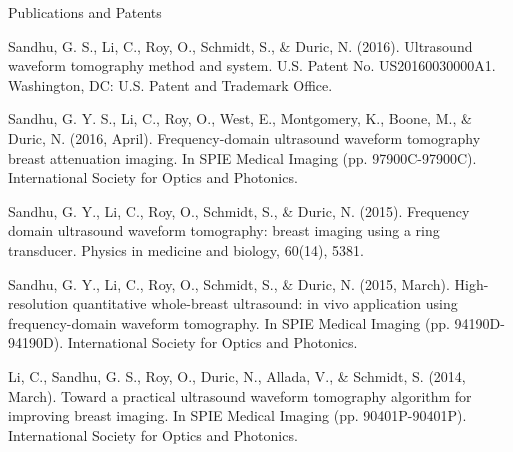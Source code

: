 \documentclass{resume} %
\begin{document}
\begin{rSection}{Publications and Patents}
\item Sandhu, G. S., Li, C., Roy, O., Schmidt, S., \& Duric, N. (2016). Ultrasound waveform tomography method and system. U.S. Patent No. US20160030000A1. Washington, DC: U.S. Patent and Trademark Office.
\item Sandhu, G. Y. S., Li, C., Roy, O., West, E., Montgomery, K., Boone, M., \& Duric, N. (2016, April). Frequency-domain ultrasound waveform tomography breast attenuation imaging. In SPIE Medical Imaging (pp. 97900C-97900C). International Society for Optics and Photonics.
\item Sandhu, G. Y., Li, C., Roy, O., Schmidt, S., \& Duric, N. (2015). Frequency domain ultrasound waveform tomography: breast imaging using a ring transducer. Physics in medicine and biology, 60(14), 5381.
\item Sandhu, G. Y., Li, C., Roy, O., Schmidt, S., \& Duric, N. (2015, March). High-resolution quantitative whole-breast ultrasound: in vivo application using frequency-domain waveform tomography. In SPIE Medical Imaging (pp. 94190D-94190D). International Society for Optics and Photonics.
\item Li, C., Sandhu, G. S., Roy, O., Duric, N., Allada, V., \& Schmidt, S. (2014, March). Toward a practical ultrasound waveform tomography algorithm for improving breast imaging. In SPIE Medical Imaging (pp. 90401P-90401P). International Society for Optics and Photonics.
\end{rSection}


\end{document}
